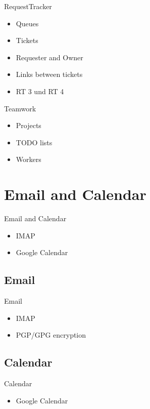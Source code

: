 \begin{frame}{RequestTracker}
\begin{itemize}
\item Queues
\item Tickets
\item Requester and Owner
\item Links between tickets
\item RT 3 und RT 4
\end{itemize}
\end{frame}

\begin{frame}{Teamwork}
\begin{itemize}
\item Projects
\item TODO lists
\item Workers
\end{itemize}
\end{frame}

\section{Email and Calendar}

\begin{frame}{Email and Calendar}
\begin{itemize}
\item IMAP
\item Google Calendar
\end{itemize}
\end{frame}

\subsection{Email}
\begin{frame}{Email}
\begin{itemize}
\item IMAP
\item PGP/GPG encryption
\end{itemize}
\end{frame}

\subsection{Calendar}
\begin{frame}{Calendar}
\begin{itemize}
\item Google Calendar
\end{itemize}
\end{frame}

